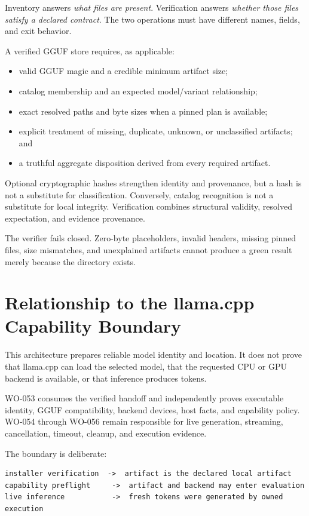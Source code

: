 \documentclass[11pt]{article}
\begin{document}
Inventory answers \emph{what files are present}. Verification answers
\emph{whether those files satisfy a declared contract}. The two operations must
have different names, fields, and exit behavior.

A verified GGUF store requires, as applicable:

\begin{itemize}[leftmargin=*]
  \item valid GGUF magic and a credible minimum artifact size;
  \item catalog membership and an expected model/variant relationship;
  \item exact resolved paths and byte sizes when a pinned plan is available;
  \item explicit treatment of missing, duplicate, unknown, or unclassified
  artifacts; and
  \item a truthful aggregate disposition derived from every required artifact.
\end{itemize}

Optional cryptographic hashes strengthen identity and provenance, but a hash is
not a substitute for classification. Conversely, catalog recognition is not a
substitute for local integrity. Verification combines structural validity,
resolved expectation, and evidence provenance.

The verifier fails closed. Zero-byte placeholders, invalid headers, missing
pinned files, size mismatches, and unexplained artifacts cannot produce a green
result merely because the directory exists.

\section{Relationship to the llama.cpp Capability Boundary}

This architecture prepares reliable model identity and location. It does not
prove that llama.cpp can load the selected model, that the requested CPU or GPU
backend is available, or that inference produces tokens.

WO-053 consumes the verified handoff and independently proves executable
identity, GGUF compatibility, backend devices, host facts, and capability
policy. WO-054 through WO-056 remain responsible for live generation,
streaming, cancellation, timeout, cleanup, and execution evidence.

The boundary is deliberate:

\begin{verbatim}
installer verification  ->  artifact is the declared local artifact
capability preflight     ->  artifact and backend may enter evaluation
live inference           ->  fresh tokens were generated by owned execution
\end{verbatim}
\end{document}
